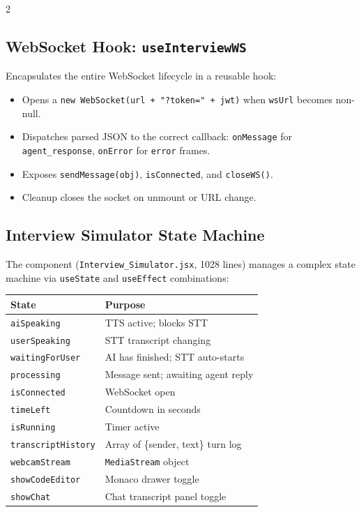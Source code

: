 \documentclass[10pt, a4paper]{article}
\begin{document}
\begin{multicols}{2}
\subsection{WebSocket Hook: \texttt{useInterviewWS}}
Encapsulates the entire WebSocket lifecycle in a reusable hook:
\begin{itemize}
  \item Opens a \texttt{new WebSocket(url + "?token=" + jwt)} when
        \texttt{wsUrl} becomes non-null.
  \item Dispatches parsed JSON to the correct callback:
        \texttt{onMessage} for \texttt{agent\_response},
        \texttt{onError} for \texttt{error} frames.
  \item Exposes \texttt{sendMessage(obj)}, \texttt{isConnected},
        and \texttt{closeWS()}.
  \item Cleanup closes the socket on unmount or URL change.
\end{itemize}

\subsection{Interview Simulator State Machine}
The component (\texttt{Interview\_Simulator.jsx}, 1028 lines) manages a
complex state machine via \texttt{useState} and \texttt{useEffect}
combinations:

\begin{center}
\scriptsize
\begin{tabular}{@{}ll@{}}
\toprule
State & Purpose \\
\midrule
\texttt{aiSpeaking} & TTS active; blocks STT \\
\texttt{userSpeaking} & STT transcript changing \\
\texttt{waitingForUser} & AI has finished; STT auto-starts \\
\texttt{processing} & Message sent; awaiting agent reply \\
\texttt{isConnected} & WebSocket open \\
\texttt{timeLeft} & Countdown in seconds \\
\texttt{isRunning} & Timer active \\
\texttt{transcriptHistory} & Array of \{sender, text\} turn log \\
\texttt{webcamStream} & \texttt{MediaStream} object \\
\texttt{showCodeEditor} & Monaco drawer toggle \\
\texttt{showChat} & Chat transcript panel toggle \\
\bottomrule
\end{tabular}
\end{center}


\end{multicols}
\end{document}
